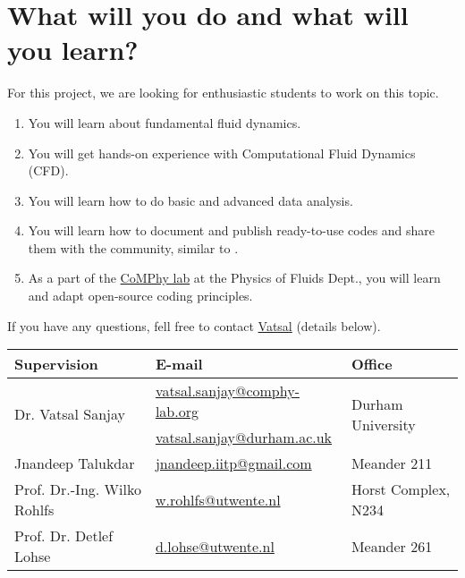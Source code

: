 \documentclass[a4paper,10pt]{article}
\begin{document}
\section*{What will you do and what will you learn?}
For this project, we are looking for enthusiastic students to work on this topic.
\begin{enumerate}
\itemsep0em
\item You will learn about fundamental fluid dynamics.
\item You will get hands-on experience with Computational Fluid Dynamics (CFD).
\item You will learn how to do basic and advanced data analysis.
\item You will learn how to document and publish ready-to-use codes and share them with the community, similar to \citet{basiliskVatsal, basiliskVatsalDropFilm, basiliskVatsalViscousBouncing}. 
\item As a part of the \href{https://comphy-lab.org}{CoMPhy lab} at the Physics of Fluids Dept., you will learn and adapt open-source coding principles. 

\end{enumerate}

If you have any questions, fell free to contact \href{mailto:vatsal.sanjay@comphy-lab.org}{Vatsal} (details below).
\begin{center}
\begin{tabular}{|l|l|l|}
\hline \textbf{Supervision} & \textbf{E-mail} & \textbf{Office} \\
\hline \multirow{2}{*}{Dr. Vatsal Sanjay} & \href{mailto:vatsal.sanjay@comphy-lab.org}{vatsal.sanjay@comphy-lab.org} & \multirow{2}{*}{Durham University} \\
& \href{mailto:vatsal.sanjay@durham.ac.uk}{vatsal.sanjay@durham.ac.uk} & \\
\hline Jnandeep Talukdar & \href{mailto:jnandeep.iitp@gmail.com}{jnandeep.iitp@gmail.com} & Meander 211 \\
\hline Prof. Dr.-Ing. Wilko Rohlfs   & \href{mailto:w.rohlfs@utwente.nl }{w.rohlfs@utwente.nl }& Horst Complex, N234 \\
\hline Prof. Dr. Detlef Lohse & \href{mailto:d.lohse@utwente.nl}{d.lohse@utwente.nl} & Meander 261  \\
\hline
\end{tabular}
\end{center}

\printbibliography
\end{document}
